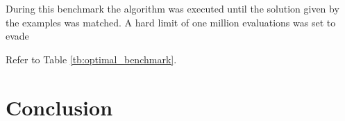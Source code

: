 \documentclass[onecolumn]{IEEEtran}
\begin{document}
During this benchmark the algorithm was executed until the solution given by the examples
was matched. A hard limit of one million evaluations was set to evade 

Refer to Table \ref{tb:optimal_benchmark}.





\section{Conclusion}




\end{document}
